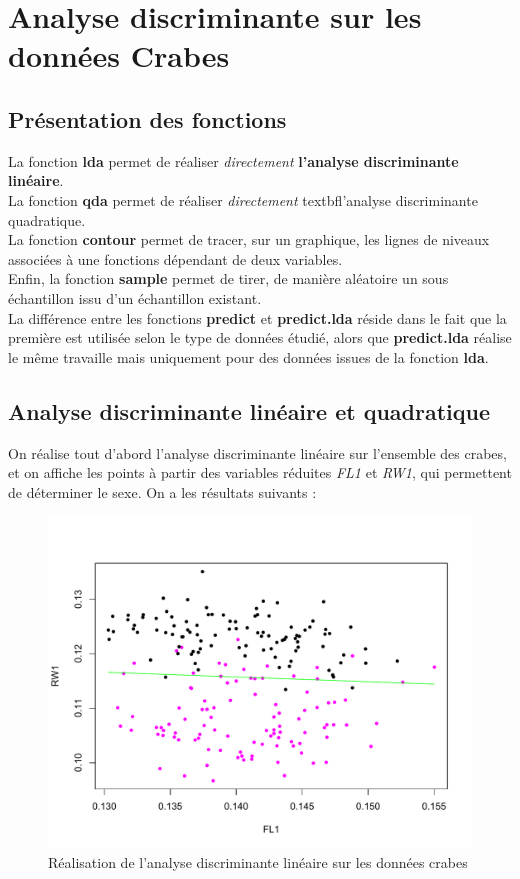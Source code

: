 \documentclass[a4paper,11pt]{article}
\begin{document}
\section{Analyse discriminante sur les données Crabes}

\subsection{Présentation des fonctions} 

\noindent La fonction \textbf{lda} permet de réaliser \textit{directement} \textbf{l'analyse discriminante linéaire}. \\

\noindent La fonction \textbf{qda} permet de réaliser \textit{directement} textbf{l'analyse discriminante quadratique}. \\

\noindent La fonction \textbf{contour} permet de tracer, sur un graphique, les lignes de niveaux associées à une fonctions dépendant de deux variables. \\

\noindent Enfin, la fonction \textbf{sample} permet de tirer, de manière aléatoire un sous échantillon issu d'un échantillon existant. \\ 

\noindent La différence entre les fonctions \textbf{predict} et \textbf{predict.lda} réside dans le fait que la première est utilisée selon le type de données étudié, alors que  \textbf{predict.lda} réalise le même travaille mais uniquement pour des données issues de la fonction \textbf{lda}. 

\subsection{Analyse discriminante linéaire et quadratique}

\noindent On réalise tout d'abord l'analyse discriminante linéaire sur l'ensemble des crabes, et on affiche les points à partir des variables réduites \textit{FL1} et \textit{RW1}, qui permettent de déterminer le sexe. On a les résultats suivants : 


\begin{figure}[H]
\begin{center}
\includegraphics[width=.6\textwidth]{img/lda}
\caption{Réalisation de l'analyse discriminante linéaire sur les données crabes}
\end{center}
\end{figure}
\end{document}
